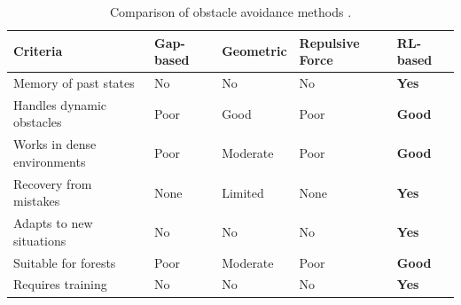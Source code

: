 \begin{table}[H]
    \small
    \centering
    \caption{Comparison of obstacle avoidance methods \cite{Butt2024,Ghambari2024,Merei2025,Debnath2024}.}
    \label{tab:avoidance_methods}
    \begin{tabular}{p{4cm} p{2cm} p{2cm} p{2.5cm} p{2cm}}
        \hline\hline
        \rowcolor{lightgray}\textbf{Criteria} & \textbf{Gap-based} & \textbf{Geometric} & \textbf{Repulsive Force} & \textbf{RL-based} \\\hline
        Memory of past states & No & No & No & \textbf{Yes} \\
        \rowcolor{lightlightgray} Handles dynamic obstacles & Poor & Good & Poor & \textbf{Good} \\
        Works in dense environments & Poor & Moderate & Poor & \textbf{Good} \\
        \rowcolor{lightlightgray} Recovery from mistakes & None & Limited & None & \textbf{Yes} \\
        Adapts to new situations & No & No & No & \textbf{Yes} \\
        \rowcolor{lightlightgray} Suitable for forests & Poor & Moderate & Poor & \textbf{Good} \\
        Requires training & No & No & No & \textbf{Yes} \\
        \hline
    \end{tabular}
\end{table}
